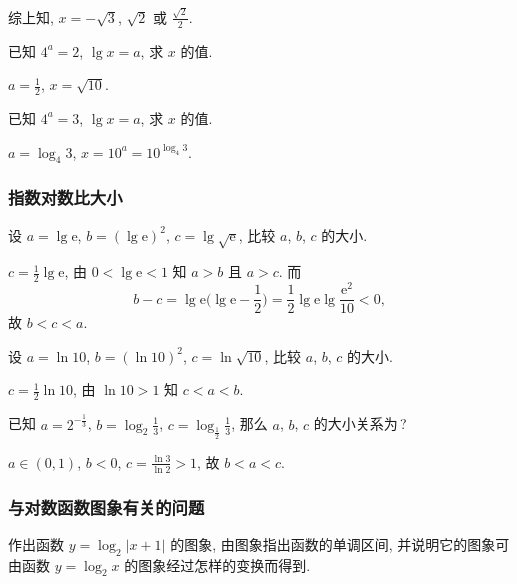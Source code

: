     综上知, $x=-\sqrt3$, $\sqrt2$ 或 $\frac{\sqrt2}2$.
  \endsolution
  
  \lianxi
  \begin{exercise}[s]
    已知 $4^a =2$, $\lg x=a$, 求 $x$ 的值.
  \end{exercise}

  \beginsolution
    $a=\frac12$, $x=\sqrt{10}$.
    
    \varexercise 已知 $4^a =3$, $\lg x=a$, 求 $x$ 的值.
    
    $a=\log_4 3$, $x=10^a=10^{\log_4 3}$.
  \endsolution
  
  \subsubsection{指数对数比大小}
  \begin{example}
    设 $a=\lg\mathrm{e}$, $b=(\lg\mathrm{e})^2$, $c=\lg\sqrt{\mathrm{e}}$,
    比较 $a$, $b$, $c$ 的大小.
  \end{example}

  \beginsolution
    $c=\frac12\lg\mathrm{e}$, 由 $0<\lg\mathrm{e}<1$ 知 $a>b$ 且 $a>c$. 
    而
    \[b-c= \lg\mathrm{e}\Big(\lg\mathrm{e}-\frac12\Big)
      =\frac12\lg\mathrm{e}\lg\frac{\mathrm{e}^2}{10}<0,\]
    故 $b<c<a$.
    
    \varexercise 设 $a=\ln 10$, $b=(\ln10)^2$, $c=\ln\sqrt{10}$, 比较 $a$, $b$, $c$ 的大小.
    
    $c=\frac12\ln10$, 由 $\ln 10>1$ 知  $c<a<b$.
  \endsolution
  
  \lianxi
  \begin{exercise}[s]
    已知 $a= 2^{-\frac13}$, $b=\log_2\frac13$, $c= \log_{\frac12}\frac13$, 
    那么 $a$, $b$, $c$ 的大小关系为\,?
  \end{exercise}

  \beginsolution
    $a\in(0,1)$, $b<0$, $c=\frac{\ln3}{\ln2}>1$, 故 $b<a<c$.
  \endsolution
  
  \subsubsection{与对数函数图象有关的问题}
  \begin{example}
    作出函数 $y=\log_2 |x+1|$ 的图象, 由图象指出函数的单调区间,
    并说明它的图象可由函数 $y=\log_2 x$ 的图象经过怎样的变换而得到.
  \end{example}


